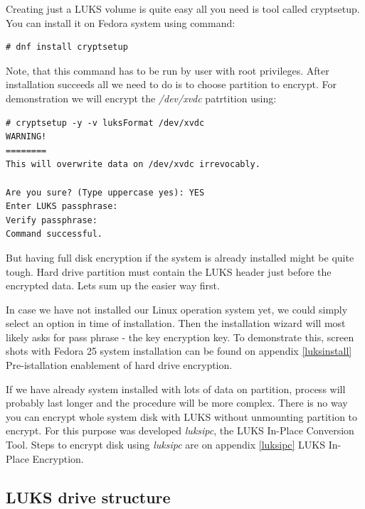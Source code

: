 Creating just a LUKS volume is quite easy all you need is tool called cryptsetup.
You can install it on Fedora system using command:
\begin{lstlisting}[columns=fixed,basicstyle=\ttfamily\footnotesize,tabsize=4,backgroundcolor=\color{yellow!10}]
# dnf install cryptsetup
\end{lstlisting}
Note, that this command has to be run by user with root privileges.
After installation succeeds all we need to do is to choose partition to encrypt.
For demonstration we will encrypt the {\it /dev/xvdc} patrtition using:
\begin{lstlisting}[columns=fixed,basicstyle=\ttfamily\footnotesize,tabsize=4,backgroundcolor=\color{yellow!10}]
# cryptsetup -y -v luksFormat /dev/xvdc
WARNING!
========
This will overwrite data on /dev/xvdc irrevocably.

Are you sure? (Type uppercase yes): YES
Enter LUKS passphrase:
Verify passphrase:
Command successful.
\end{lstlisting}
But having full disk encryption if the system is already installed might be quite tough.
Hard drive partition must contain the LUKS header just before the encrypted data.
Lets sum up the easier way first.

In case we have not installed our Linux operation system yet, we could simply select an option in time of installation.
Then the installation wizard will most likely asks for pass phrase - the key encryption key.
To demonstrate this, screen shots with Fedora 25 system installation can be found on appendix \ref{luksinstall} Pre-istallation enablement of hard drive encryption.

If we have already system installed with lots of data on partition, process will probably last longer and the procedure will be more complex.
There is no way you can encrypt whole system disk with LUKS without unmounting partition to encrypt.
For this purpose was developed {\it luksipc}, the LUKS In-Place Conversion Tool.
Steps to encrypt disk using {\it luksipc} are on appendix \ref{luksipc} LUKS In-Place Encryption.



\subsection{LUKS drive structure}


